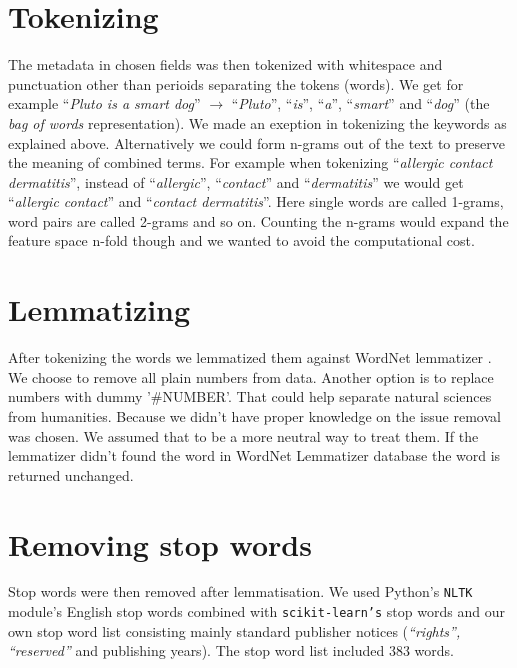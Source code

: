 \section{Tokenizing}
The metadata in chosen fields was then tokenized with whitespace 
and punctuation other than perioids separating the tokens (words). 
We get for example ``\emph{Pluto is a smart dog}'' $\rightarrow$ 
``\emph{Pluto}'', ``\emph{is}'', ``\emph{a}'', ``\emph{smart}'' 
and ``\emph{dog}'' (the \emph{bag of words} representation).
We made an exeption in tokenizing the keywords as explained above.
Alternatively we could form n-grams out of the text to preserve 
the meaning of combined terms. For example when tokenizing 
``\emph{allergic contact dermatitis}'', instead of 
``\emph{allergic}'', ``\emph{contact}'' and 
``\emph{dermatitis}'' we would get ``\emph{allergic contact}'' 
and ``\emph{contact dermatitis}''. Here single words are called 
1-grams, word pairs are called 2-grams and so on. Counting the 
n-grams would expand the feature space n-fold though and we wanted 
to avoid the computational cost. 

\section{Lemmatizing}
After tokenizing the words we lemmatized them against WordNet 
lemmatizer \cite{noauthor_princeton_2010}.
We choose to remove all plain numbers from
data. Another option is to replace numbers with dummy '\#NUMBER'.
That could help separate natural sciences from humanities. Because 
we didn't have proper knowledge on the issue removal was chosen. 
We assumed that to be a more neutral way to treat them. 
If the lemmatizer didn't found the word in WordNet Lemmatizer 
database the word is returned unchanged. 

\section{Removing stop words}
Stop words were then removed after lemmatisation. We used Python's
\texttt{NLTK} module's English stop words 
combined with \texttt{scikit-learn's} stop words and our own stop 
word list consisting mainly standard publisher notices 
(\emph{``rights'', ``reserved''} and publishing years). The stop 
word list included $383$ words.


